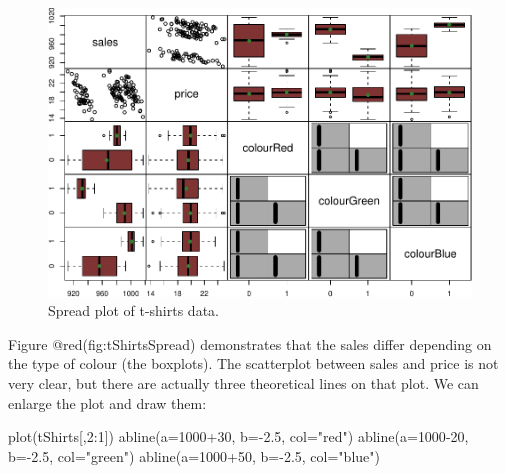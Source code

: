 \documentclass[
]{book}
\newenvironment{Shaded}{\begin{snugshade}}{\end{snugshade}}
\newcommand{\AttributeTok}[1]{\textcolor[rgb]{0.77,0.63,0.00}{#1}}
\newcommand{\DecValTok}[1]{\textcolor[rgb]{0.00,0.00,0.81}{#1}}
\newcommand{\FloatTok}[1]{\textcolor[rgb]{0.00,0.00,0.81}{#1}}
\newcommand{\FunctionTok}[1]{\textcolor[rgb]{0.00,0.00,0.00}{#1}}
\newcommand{\NormalTok}[1]{#1}
\newcommand{\SpecialCharTok}[1]{\textcolor[rgb]{0.00,0.00,0.00}{#1}}
\newcommand{\StringTok}[1]{\textcolor[rgb]{0.31,0.60,0.02}{#1}}
\theoremstyle{definition}
\theoremstyle{definition}
\theoremstyle{definition}
\theoremstyle{definition}
\theoremstyle{remark}
\begin{document}
\begin{figure}
\centering
\includegraphics{Svetunkov---Statistics-for-Business-Analytics_files/figure-latex/tShirtsSpread-1.pdf}
\caption{\label{fig:tShirtsSpread}Spread plot of t-shirts data.}
\end{figure}

Figure @red(fig:tShirtsSpread) demonstrates that the sales differ depending on the type of colour (the boxplots). The scatterplot between sales and price is not very clear, but there are actually three theoretical lines on that plot. We can enlarge the plot and draw them:

\begin{Shaded}
\begin{Highlighting}[]
\FunctionTok{plot}\NormalTok{(tShirts[,}\DecValTok{2}\SpecialCharTok{:}\DecValTok{1}\NormalTok{])}
\FunctionTok{abline}\NormalTok{(}\AttributeTok{a=}\DecValTok{1000}\SpecialCharTok{+}\DecValTok{30}\NormalTok{, }\AttributeTok{b=}\SpecialCharTok{{-}}\FloatTok{2.5}\NormalTok{, }\AttributeTok{col=}\StringTok{"red"}\NormalTok{)}
\FunctionTok{abline}\NormalTok{(}\AttributeTok{a=}\DecValTok{1000{-}20}\NormalTok{, }\AttributeTok{b=}\SpecialCharTok{{-}}\FloatTok{2.5}\NormalTok{, }\AttributeTok{col=}\StringTok{"green"}\NormalTok{)}
\FunctionTok{abline}\NormalTok{(}\AttributeTok{a=}\DecValTok{1000}\SpecialCharTok{+}\DecValTok{50}\NormalTok{, }\AttributeTok{b=}\SpecialCharTok{{-}}\FloatTok{2.5}\NormalTok{, }\AttributeTok{col=}\StringTok{"blue"}\NormalTok{)}
\end{Highlighting}
\end{Shaded}
\end{document}
